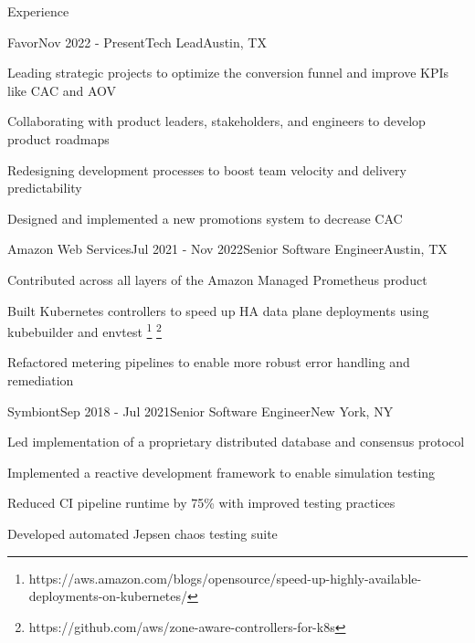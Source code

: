 \documentclass[
	11pt, %
]{resume} %
\begin{document}
\begin{rSection}{Experience}

	\begin{rSubsection}{Favor}{Nov 2022 - Present}{Tech Lead}{Austin, TX}
        \item Leading strategic projects to optimize the conversion funnel and improve KPIs like CAC and AOV
        \item Collaborating with product leaders, stakeholders, and engineers to develop product roadmaps
        \item Redesigning development processes to boost team velocity and delivery predictability
        \item Designed and implemented a new promotions system to decrease CAC
	\end{rSubsection}


    \begin{rSubsection}{Amazon Web Services}{Jul 2021 - Nov 2022}{Senior Software Engineer}{Austin, TX}
        \item Contributed across all layers of the Amazon Managed Prometheus product
        \item Built Kubernetes controllers to speed up HA data plane deployments using kubebuilder and envtest \footnote{https://aws.amazon.com/blogs/opensource/speed-up-highly-available-deployments-on-kubernetes/} \footnote{https://github.com/aws/zone-aware-controllers-for-k8s}
        \item Refactored metering pipelines to enable more robust error handling and remediation
    \end{rSubsection}

    \begin{rSubsection}{Symbiont}{Sep 2018 - Jul 2021}{Senior Software Engineer}{New York, NY}
        \item Led implementation of a proprietary distributed database and consensus protocol
        \item Implemented a reactive development framework to enable simulation testing
        \item Reduced CI pipeline runtime by 75\% with improved testing practices
        \item Developed automated Jepsen chaos testing suite
    \end{rSubsection}



\end{rSection}
\end{document}
